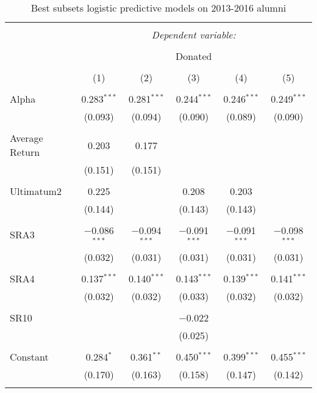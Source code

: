 \begin{table}[H] \centering 
  \caption{Best subsets logistic predictive models on 2013-2016 alumni} 
  \label{} 
  \begin{adjustbox}{width=\textwidth}
\begin{tabular}{@{\extracolsep{5pt}}lccccc} 
\\[-1.8ex]\hline 
\hline \\[-1.8ex] 
 & \multicolumn{5}{c}{\textit{Dependent variable:}} \\ 
\cline{2-6} 
\\[-1.8ex] & \multicolumn{5}{c}{Donated} \\ 
\\[-1.8ex] & (1) & (2) & (3) & (4) & (5)\\ 
\hline \\[-1.8ex] 
 Alpha & 0.283$^{***}$ & 0.281$^{***}$ & 0.244$^{***}$ & 0.246$^{***}$ & 0.249$^{***}$ \\ 
  & (0.093) & (0.094) & (0.090) & (0.089) & (0.090) \\ 
  & & & & & \\ 
 Average Return & 0.203 & 0.177 &  &  &  \\ 
  & (0.151) & (0.151) &  &  &  \\ 
  & & & & & \\ 
 Ultimatum2 & 0.225 &  & 0.208 & 0.203 &  \\ 
  & (0.144) &  & (0.143) & (0.143) &  \\ 
  & & & & & \\ 
 SRA3 & $-$0.086$^{***}$ & $-$0.094$^{***}$ & $-$0.091$^{***}$ & $-$0.091$^{***}$ & $-$0.098$^{***}$ \\ 
  & (0.032) & (0.031) & (0.031) & (0.031) & (0.031) \\ 
  & & & & & \\ 
 SRA4 & 0.137$^{***}$ & 0.140$^{***}$ & 0.143$^{***}$ & 0.139$^{***}$ & 0.141$^{***}$ \\ 
  & (0.032) & (0.032) & (0.033) & (0.032) & (0.032) \\ 
  & & & & & \\ 
 SR10 &  &  & $-$0.022 &  &  \\ 
  &  &  & (0.025) &  &  \\ 
  & & & & & \\ 
 Constant & 0.284$^{*}$ & 0.361$^{**}$ & 0.450$^{***}$ & 0.399$^{***}$ & 0.455$^{***}$ \\ 
  & (0.170) & (0.163) & (0.158) & (0.147) & (0.142) \\ 
  & & & & & \\ 

\end{tabular}
\end{adjustbox}
\end{table}
